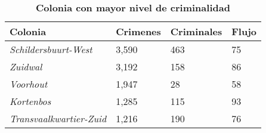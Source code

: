 \def\arraystretch{1.5} %
\begin{table}[H]
\centering
\caption{\textbf{Colonia con mayor nivel de criminalidad}}
\footnotesize
\centering
\begin{tabular}{p{3cm} p{1.5cm} p{1.5cm} p{1.5cm}}
\textbf{Colonia} &  \textbf{Crimenes} & \textbf{Criminales} & \textbf{Flujo}\\
\hline
\hline 
\textit{Schildersbuurt-West} & 3,590 & 463 & 75 \\
\textit{Zuidwal} & 3,192 & 158 & 86\\
\textit{Voorhout} & 1,947 & 28 & 58\\
\textit{Kortenbos} & 1,285 & 115 & 93\\
\textit{Transvaalkwartier-Zuid} & 1,216 & 190 & 76 
\end{tabular}
\label{tab:mayor_crimen}
\end{table}	
